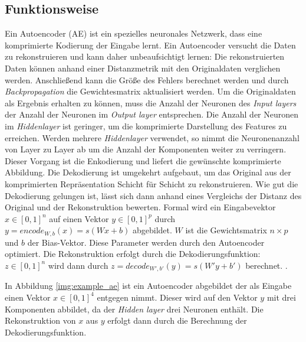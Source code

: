 \subsection{Funktionsweise}
Ein Autoencoder (AE) ist ein spezielles neuronales Netzwerk, dass eine komprimierte Kodierung der Eingabe lernt. Ein Autoencoder versucht die Daten zu rekonstruieren und kann daher unbeaufsichtigt lernen: Die rekonstruierten Daten können anhand einer Distanzmetrik mit den Originaldaten verglichen werden. Anschließend kann die Größe des Fehlers berechnet werden und durch \textit{Backpropagation} die Gewichtesmatrix aktualisiert werden.
Um die Originaldaten als Ergebnis erhalten zu können, muss die Anzahl der Neuronen des \textit{Input layers} der Anzahl der Neuronen im \textit{Output layer} entsprechen. Die Anzahl der Neuronen im \textit{Hiddenlayer} ist geringer, um die komprimierte Darstellung des Features zu erreichen. Werden mehrere \textit{Hiddenlayer} verwendet, so nimmt die Neuronenanzahl von Layer zu Layer ab um die Anzahl der Komponenten weiter zu verringern. Dieser Vorgang ist die Enkodierung und liefert die gewünschte komprimierte Abbildung. Die Dekodierung ist umgekehrt aufgebaut, um das Original aus der komprimierten Repräsentation Schicht für Schicht zu rekonstruieren. Wie gut die Dekodierung gelungen ist, lässt sich dann anhand eines Vergleichs der Distanz des Original und der Rekonstruktion bewerten. Formal wird ein Eingabevektor $x \in [0,1]^n$ auf einen Vektor $y \in [0,1]^p$ durch $y = encode_{W,b}(x) = s(Wx + b)$ abgebildet. $W$ ist die Gewichtsmatrix $n \times p$ und $b$ der Bias-Vektor. Diese Parameter werden durch den Autoencoder optimiert. Die Rekonstruktion erfolgt durch die Dekodierungsfunktion: $z \in [0, 1]^n$ wird dann durch $z = decode_{W', b'}(y) = s(W'y + b')$ berechnet. \cite{ssn1997}.

In Abbildung \ref{img:example_ae} ist ein Autoencoder abgebildet der als Eingabe einen Vektor $x \in [0,1]^4$ entgegen nimmt. Dieser wird auf den Vektor $y$ mit drei Komponenten abbildet, da der \textit{Hidden layer} drei Neuronen enthält. Die Rekonstruktion von $x$ aus $y$ erfolgt dann durch die Berechnung der Dekodierungsfunktion. 

